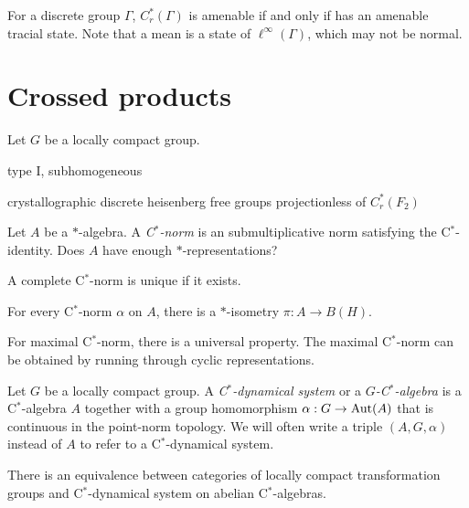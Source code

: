 \documentclass{../../large}
\begin{document}
For a discrete group $\Gamma$, $C^*_r(\Gamma)$ is amenable if and only if has an amenable tracial state.
Note that a mean is a state of $\ell^\infty(\Gamma)$, which may not be normal.






\section{Crossed products}


\begin{prb}
Let $G$ be a locally compact group.

\end{prb}


type I, subhomogeneous


crystallographic
discrete heisenberg
free groups
projectionless of $C_r^*(F_2)$



\begin{prb}
Let $A$ be a $*$-algebra.
A \emph{C$^*$-norm} is an submultiplicative norm satisfying the C$^*$-identity.
Does $A$ have enough $*$-representations?
\begin{parts}
\item A complete C$^*$-norm is unique if it exists.
\item For every C$^*$-norm $\alpha$ on $A$, there is a $*$-isometry $\pi:A\to B(H)$.
\item For maximal C$^*$-norm, there is a universal property. The maximal C$^*$-norm can be obtained by running through cyclic representations.
\end{parts}
\end{prb}




\begin{prb}
Let $G$ be a locally compact group.
A \emph{C$^*$-dynamical system} or a \emph{$G$-C$^*$-algebra} is a C$^*$-algebra $A$ together with a group homomorphism $\alpha:G\to\operatorname{Aut}(A)$ that is continuous in the point-norm topology.
We will often write a triple $(A,G,\alpha)$ instead of $A$ to refer to a C$^*$-dynamical system.
\begin{parts}
\item There is an equivalence between categories of locally compact transformation groups and C$^*$-dynamical system on abelian C$^*$-algebras.
\end{parts}
\end{prb}
\end{document}
